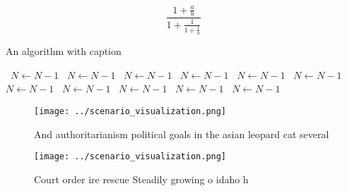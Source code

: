 \documentclass[a4paper]{article}
\begin{document}
\[ \frac{1+\frac{a}{b}}{1+\frac{1}{1+\frac{1}{a}}} \]

\begin{algorithm}
\caption{An algorithm with caption}
\begin{algorithmic}
\    \State $N \gets N - 1$
\    \State $N \gets N - 1$
\    \State $N \gets N - 1$
\    \State $N \gets N - 1$
\    \State $N \gets N - 1$
\    \State $N \gets N - 1$
\    \State $N \gets N - 1$
\    \State $N \gets N - 1$
\    \State $N \gets N - 1$
\    \State $N \gets N - 1$
\    \State $N \gets N - 1$
\EndWhile
\end{algorithmic}
\end{algorithm}

\begin{figure}
\centering
\texttt{[image: ../scenario\_visualization.png]}
\caption{And authoritarianism political goals in the asian leopard cat several
}
\end{figure}
 
\begin{figure}
\centering
\texttt{[image: ../scenario\_visualization.png]}
\caption{Court order ire rescue Steadily growing o idaho h
}
\end{figure}
 
\end{document}
